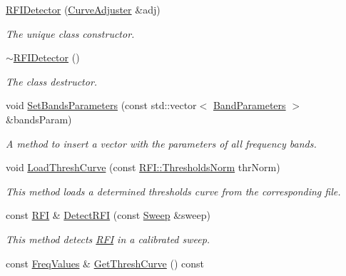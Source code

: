 \begin{DoxyCompactItemize}
\item 
\hyperlink{classRFIDetector_a1943c00a5ab657a24cdacaf2b0d550f1}{R\+F\+I\+Detector} (\hyperlink{classCurveAdjuster}{Curve\+Adjuster} \&adj)
\begin{DoxyCompactList}\small\item\em The unique class constructor. \end{DoxyCompactList}\item 
\hyperlink{classRFIDetector_a6445cd27f7b22459d8f1e3b67c323cf0}{$\sim$\+R\+F\+I\+Detector} ()
\begin{DoxyCompactList}\small\item\em The class destructor. \end{DoxyCompactList}\item 
\mbox{\label{classRFIDetector_aea149c6aa9fa7db44616973b27863ebc}} 
void \hyperlink{classRFIDetector_aea149c6aa9fa7db44616973b27863ebc}{Set\+Bands\+Parameters} (const std\+::vector$<$ \hyperlink{structBandParameters}{Band\+Parameters} $>$ \&bands\+Param)
\begin{DoxyCompactList}\small\item\em A method to insert a vector with the parameters of all frequency bands. \end{DoxyCompactList}\item 
void \hyperlink{classRFIDetector_a1eba12febd92bba77f658dfe664ea5c6}{Load\+Thresh\+Curve} (const \hyperlink{structRFI_a18cfa7d24274bbcd14acc6b513860cb0}{R\+F\+I\+::\+Thresholds\+Norm} thr\+Norm)
\begin{DoxyCompactList}\small\item\em This method loads a determined thresholds curve from the corresponding file. \end{DoxyCompactList}\item 
const \hyperlink{structRFI}{R\+FI} \& \hyperlink{classRFIDetector_a98bf817b6c6aee954e0f0056fb5e4360}{Detect\+R\+FI} (const \hyperlink{structSweep}{Sweep} \&sweep)
\begin{DoxyCompactList}\small\item\em This method detects \hyperlink{structRFI}{R\+FI} in a calibrated sweep. \end{DoxyCompactList}\item 
\mbox{\label{classRFIDetector_a6e2c5fbdb76bc7b752fb0fec3bc4f41c}} 
const \hyperlink{structFreqValues}{Freq\+Values} \& \hyperlink{classRFIDetector_a6e2c5fbdb76bc7b752fb0fec3bc4f41c}{Get\+Thresh\+Curve} () const

\end{DoxyCompactItemize}
